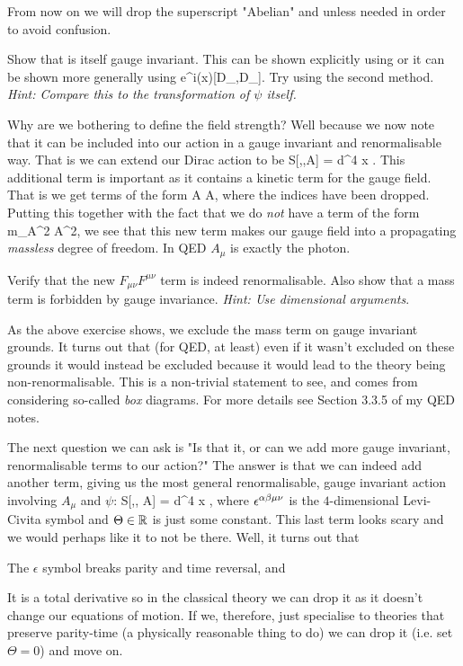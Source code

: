 \bnn 
    From now on we will drop the superscript "Abelian" and unless needed in order to avoid confusion. 
\enn 

\bbox 
    Show that  is itself gauge invariant. This can be shown explicitly using  or it can be shown more generally using
    \bse 
        [D_{\mu},D_{\nu}]\psi \to e^{i\Lambda(x)}[D_{\mu},D_{\nu}]\psi.
    \ese 
    Try using the second method. \textit{Hint: Compare this to the transformation of $\psi$ itself.}
\ebox 

Why are we bothering to define the field strength? Well because we now note that it can be included into our action in a gauge invariant and renormalisable way. That is we can extend our Dirac action to be 
\bse 
    S[\psi,\overline{\psi},A] = \int d^4 x .
\ese
This additional term is important as it contains a kinetic term for the gauge field. That is we get terms of the form 
\bse 
    \p A \p A,
\ese 
where the indices have been dropped. Putting this together with the fact that we do \textit{not} have a term of the form 
\bse 
    m_A^2 A^2,
\ese 
we see that this new term makes our gauge field into a propagating \textit{massless} degree of freedom. In QED $A_{\mu}$ is exactly the photon. 

\bbox 
    Verify that the new $F_{\mu\nu}F^{\mu\nu}$ term is indeed renormalisable. Also show that a mass term is forbidden by gauge invariance. \textit{Hint: Use dimensional arguments}.
\ebox 

\br 
    As the above exercise shows, we exclude the mass term on gauge invariant grounds. It turns out that (for QED, at least) even if it wasn't excluded on these grounds it would instead be excluded because it would lead to the theory being non-renormalisable. This is a non-trivial statement to see, and comes from considering so-called \textit{box} diagrams. For more details see Section 3.3.5 of my QED notes.
\er 

The next question we can ask is "Is that it, or can we add more gauge invariant, renormalisable terms to our action?" The answer is that we can indeed add another term, giving us the most general renormalisable, gauge invariant action involving $A_{\mu}$ and $\psi$:
\bse 
    S[\psi,\overline{\psi}, A] = \int d^4 x ,
\ese 
where $\epsilon^{\alpha\beta\mu\nu}$ is the $4$-dimensional Levi-Civita symbol and $\Theta\in\mathbb{R}$ is just some constant. This last term looks scary and we would perhaps like it to not be there. Well, it turns out that 
\ben[label=(\roman*)]
    \item The $\epsilon$ symbol breaks parity and time reversal, and
    \item It is a total derivative so in the classical theory we can drop it as it doesn't change our equations of motion.
\een  
If we, therefore, just specialise to theories that preserve parity-time (a physically reasonable thing to do) we can drop it (i.e. set $\Theta=0$) and move on. 

